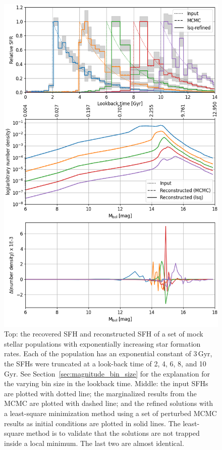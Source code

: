 \documentclass[fleqn,usenatbib]{mnras}
\begin{document}
\begin{figure}
  \includegraphics[width=\columnwidth]{figures/fig_01_exponential_decay_wdlf.png}
  \caption{Top: the recovered SFH and reconstructed SFH of a set of mock stellar
  populations with exponentially increasing star formation rates. Each of
  the population has an exponential constant of 3\,Gyr, the SFHs were truncated
  at a look-back time of 2, 4, 6, 8, and 10\,Gyr. See 
  Section~\ref{sec:magnitude_bin_size} for the explanation for the varying bin
  size in the lookback time. Middle: the input SFHs are plotted with dotted
  line; the marginalized results from the MCMC are plotted with dashed line;
  and the refined solutions with a least-square minimization method using a set
  of perturbed MCMC results as initial conditions are plotted in solid lines.
  The least-square method is to validate that the solutions are not trapped
  inside a local minimum. The last two are almost identical.}
  \label{fig:exponential_sfh}
\end{figure}
\end{document}
